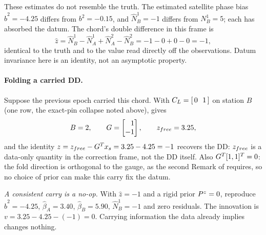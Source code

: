 \documentclass[main.tex]{subfiles}
\begin{document}
These estimates do not resemble the truth.  The estimated satellite
phase bias $\hat b^2 = -4.25$ differs from $b^2 = -0.15$, and
$\hat N^1_B = -1$ differs from $N^1_B = 5$; each has absorbed the
datum.  The chord's double difference in this frame is
\[
\hat z = \hat N^1_B - \hat N^1_A + \hat N^2_A - \hat N^2_B
       = -1 - 0 + 0 - 0 = -1,
\]
identical to the truth and to the value read directly off the
observations.  Datum invariance here is an identity, not an asymptotic
property.

\paragraph{Folding a carried DD.}
Suppose the previous epoch carried this chord.  With
$C_L = [\,0\ \ 1\,]$ on station $B$ (one row, the exact-pin
collapse noted above),  gives
\[
B = 2,
\qquad
G = \begin{bmatrix}\phantom{-}1\\-1\end{bmatrix},
\qquad
z_{free} = 3.25 ,
\]
and the identity $z = z_{free} - G^{T}x_s = 3.25 - 4.25 = -1$
recovers the DD: $z_{free}$ is a data-only quantity in the correction
frame, not the DD itself.  Also $G^{T}[1,1]^{T} = 0$: the fold
direction is orthogonal to the gauge, as the second Remark of
 requires, so no choice of prior can make
this carry fix the datum.

\emph{A consistent carry is a no-op.}  With $\hat z = -1$ and a rigid
prior $P^{z} = 0$,  reproduce
$\hat b^2 = -4.25$, $\hat\beta_A = 3.40$, $\hat\beta_B = 5.90$,
$\hat N^1_B = -1$ and zero residuals.  The innovation is
$v = 3.25 - 4.25 - (-1) = 0$.  Carrying information the data already
implies changes nothing.
\end{document}
